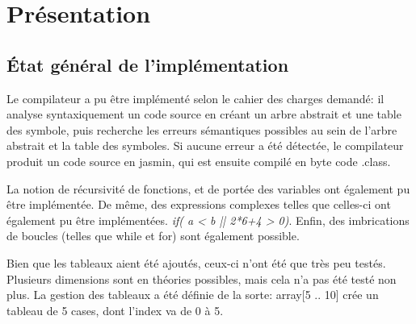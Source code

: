 \documentclass[11pt,a4paper]{article}
\title{\vartitle}
\author{\varauthor}
\date{\vardate}
\begin{document}
  \begin{titlepage}
    \maketitle

    \thispagestyle{empty}

    \begin{abstract}
    Ce rapport décrit l'implémentation d'un compilateur du langage Hepial, défini les spécifications en annexe.
    \end{abstract}


    \tableofcontents

  \end{titlepage}

  \newpage

  \section{Présentation}
  
  \subsection{État général de l'implémentation}  
  
    \par Le compilateur a pu être implémenté selon le cahier des charges demandé: il analyse syntaxiquement un code source en créant un arbre abstrait et une table des symbole, puis recherche les erreurs sémantiques possibles au sein de l'arbre abstrait et la table des symboles. Si aucune erreur a été détectée, le compilateur produit un code source en jasmin, qui est ensuite compilé en byte code .class. 
    
     \par La notion de récursivité de fonctions, et de portée des variables ont également pu être implémentée. De même, des expressions complexes telles que celles-ci ont également pu être implémentées. \textit{if( a < b || 2*6+4 > 0)}. Enfin, des imbrications de boucles (telles que while et for) sont également possible. 
     
     \par Bien que les tableaux aient été ajoutés, ceux-ci n'ont été que très peu testés. Plusieurs dimensions sont en théories possibles, mais cela n'a pas été testé non plus. La gestion des tableaux a été définie de la sorte: array[5 .. 10] crée un tableau de 5 cases, dont l'index va de 0 à 5. 
     
\end{document}
